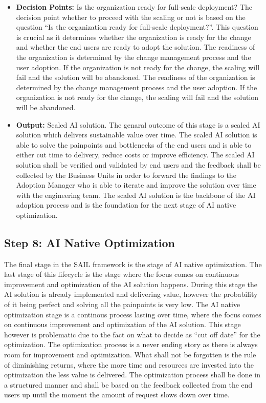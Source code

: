 \documentclass[]{imc-inf}
\begin{document}
\begin{itemize}
	\item
	\textbf{Decision Points:} Is the organization ready for full-scale
	deployment? The decision point whether to proceed with the scaling or
	not is based on the question ``Is the organization ready for
	full-scale deployment?''. This question is crucial as it determines
	whether the organization is ready for the change and whether the end
	users are ready to adopt the solution. The readiness of the
	organization is determined by the change management process and the
	user adoption. If the organization is not ready for the change, the
	scaling will fail and the solution will be abandoned. The readiness of
	the organization is determined by the change management process and
	the user adoption. If the organization is not ready for the change,
	the scaling will fail and the solution will be abandoned.
	\item
	\textbf{Output:} Scaled AI solution. The genaral outcome of this stage
	is a scaled AI solution which delivers sustainable value over time.
	The scaled AI solution is able to solve the painpoints and bottlenecks
	of the end users and is able to either cut time to delivery, reduce
	costs or improve efficiency. The scaled AI solution shall be verified
	and validated by end users and the feedback shall be collected by the
	Business Units in order to forward the findings to the Adoption
	Manager who is able to iterate and improve the solution over time with
	the engineering team. The scaled AI solution is the backbone of the AI
	adoption process and is the foundation for the next stage of AI native
	optimization.
\end{itemize}

\subsection{Step 8: AI Native
	Optimization}\label{step-8-ai-native-optimization}

The final stage in the SAIL framework is the stage of AI native
optimization. The last stage of this lifecycle is the stage where the
focus comes on continuous improvement and optimization of the AI
solution happens. During this stage the AI solution is already
implemented and delivering value, however the probability of it being
perfect and solving all the painpoints is very low. The AI native
optimization stage is a continous process lasting over time, where the
focus comes on continuous improvement and optimization of the AI
solution. This stage however is problematic due to the fact on what to
decide as ``cut off date'' for the optimization. The optimization
process is a never ending story as there is always room for improvement
and optimization. What shall not be forgotten is the rule of diminishing
returns, where the more time and resources are invested into the
optimization the less value is delivered. The optimization process shall
be done in a structured manner and shall be based on the feedback
collected from the end users up until the moment the amount of request
slows down over time.
\end{document}
